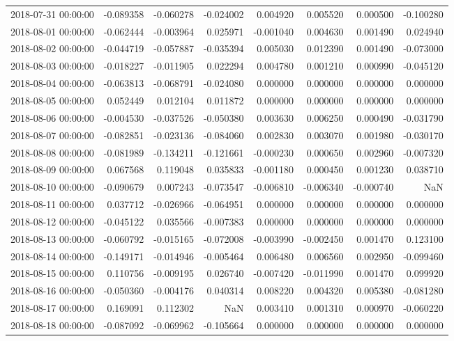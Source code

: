 \begin{tabular}{lrrrrrrr}
2018-07-31 00:00:00 & -0.089358 & -0.060278 & -0.024002 & 0.004920 & 0.005520 & 0.000500 & -0.100280 \\
2018-08-01 00:00:00 & -0.062444 & -0.003964 & 0.025971 & -0.001040 & 0.004630 & 0.001490 & 0.024940 \\
2018-08-02 00:00:00 & -0.044719 & -0.057887 & -0.035394 & 0.005030 & 0.012390 & 0.001490 & -0.073000 \\
2018-08-03 00:00:00 & -0.018227 & -0.011905 & 0.022294 & 0.004780 & 0.001210 & 0.000990 & -0.045120 \\
2018-08-04 00:00:00 & -0.063813 & -0.068791 & -0.024080 & 0.000000 & 0.000000 & 0.000000 & 0.000000 \\
2018-08-05 00:00:00 & 0.052449 & 0.012104 & 0.011872 & 0.000000 & 0.000000 & 0.000000 & 0.000000 \\
2018-08-06 00:00:00 & -0.004530 & -0.037526 & -0.050380 & 0.003630 & 0.006250 & 0.000490 & -0.031790 \\
2018-08-07 00:00:00 & -0.082851 & -0.023136 & -0.084060 & 0.002830 & 0.003070 & 0.001980 & -0.030170 \\
2018-08-08 00:00:00 & -0.081989 & -0.134211 & -0.121661 & -0.000230 & 0.000650 & 0.002960 & -0.007320 \\
2018-08-09 00:00:00 & 0.067568 & 0.119048 & 0.035833 & -0.001180 & 0.000450 & 0.001230 & 0.038710 \\
2018-08-10 00:00:00 & -0.090679 & 0.007243 & -0.073547 & -0.006810 & -0.006340 & -0.000740 & NaN \\
2018-08-11 00:00:00 & 0.037712 & -0.026966 & -0.064951 & 0.000000 & 0.000000 & 0.000000 & 0.000000 \\
2018-08-12 00:00:00 & -0.045122 & 0.035566 & -0.007383 & 0.000000 & 0.000000 & 0.000000 & 0.000000 \\
2018-08-13 00:00:00 & -0.060792 & -0.015165 & -0.072008 & -0.003990 & -0.002450 & 0.001470 & 0.123100 \\
2018-08-14 00:00:00 & -0.149171 & -0.014946 & -0.005464 & 0.006480 & 0.006560 & 0.002950 & -0.099460 \\
2018-08-15 00:00:00 & 0.110756 & -0.009195 & 0.026740 & -0.007420 & -0.011990 & 0.001470 & 0.099920 \\
2018-08-16 00:00:00 & -0.050360 & -0.004176 & 0.040314 & 0.008220 & 0.004320 & 0.005380 & -0.081280 \\
2018-08-17 00:00:00 & 0.169091 & 0.112302 & NaN & 0.003410 & 0.001310 & 0.000970 & -0.060220 \\
2018-08-18 00:00:00 & -0.087092 & -0.069962 & -0.105664 & 0.000000 & 0.000000 & 0.000000 & 0.000000 \\

\end{tabular}
